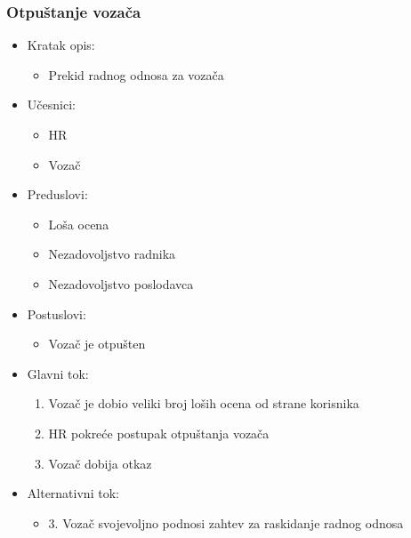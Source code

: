 \subsubsection{\bfseries Otpuštanje vozača}
\begin{itemize}
	\item Kratak opis:
		\begin{itemize}
			\item Prekid radnog odnosa za vozača
		\end{itemize}

	\item Učesnici:
		\begin{itemize}
		    \item HR
		    \item Vozač
		\end{itemize}


	\item Preduslovi:
		\begin{itemize}
		    \item Loša ocena
		    \item Nezadovoljstvo radnika
		    \item Nezadovoljstvo poslodavca
		\end{itemize}


	\item Postuslovi:
		\begin{itemize}
			\item Vozač je otpušten
	\end{itemize}

	\item Glavni tok:
		\begin{enumerate}
		    \item Vozač je dobio veliki broj loših ocena od strane korisnika
		    \item HR pokreće postupak otpuštanja vozača
		    \item Vozač dobija otkaz
		\end{enumerate}

	\item Alternativni tok:
		\begin{itemize}
		    \item 3. Vozač svojevoljno podnosi zahtev za raskidanje radnog odnosa
		\end{itemize}

\end{itemize}


